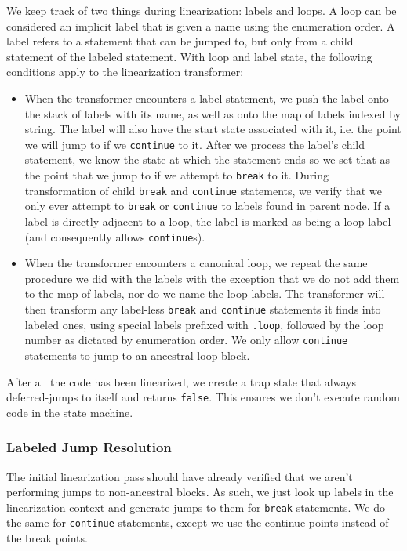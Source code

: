 \documentclass[journal,a4paper]{IEEEtran}
\begin{document}
We keep track of two things during linearization: labels and loops. A loop can be considered an
implicit label that is given a name using the enumeration order. A label refers to a statement that
can be jumped to, but only from a child statement of the labeled statement. With loop and label
state, the following conditions apply to the linearization transformer:

\begin{itemize}
\item When the transformer encounters a label statement, we push the label onto the stack of labels
with its name, as well as onto the map of labels indexed by string. The label will also have the
start state associated with it, i.e. the point we will jump to if we \texttt{continue} to it. After
we process the label's child statement, we know the state at which the statement ends so we set
that as the point that we jump to if we attempt to \texttt{break} to it. During transformation of
child \texttt{break} and \texttt{continue} statements, we verify that we only ever attempt to
\texttt{break} or \texttt{continue} to labels found in parent node. If a label is directly adjacent
to a loop, the label is marked as being a loop label (and consequently allows \texttt{continue}s).

\item When the transformer encounters a canonical loop, we repeat the same procedure we did with
the labels with the exception that we do not add them to the map of labels, nor do we name the loop
labels. The transformer will then transform any label-less \texttt{break} and \texttt{continue}
statements it finds into labeled ones, using special labels prefixed with \texttt{.loop}, followed
by the loop number as dictated by enumeration order. We only allow \texttt{continue} statements
to jump to an ancestral loop block.
\end{itemize}

After all the code has been linearized, we create a trap state that always deferred-jumps to itself
and returns \texttt{false}. This ensures we don't execute random code in the state machine.

\subsubsection{Labeled Jump Resolution}

The initial linearization pass should have already verified that we aren't performing jumps to
non-ancestral blocks. As such, we just look up labels in the linearization context and generate
jumps to them for \texttt{break} statements. We do the same for \texttt{continue} statements,
except we use the continue points instead of the break points.
\end{document}
